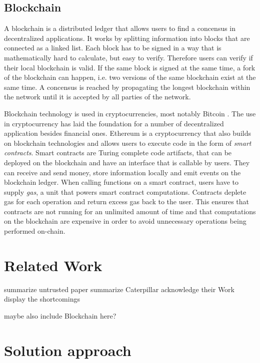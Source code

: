 \documentclass[runningheads]{llncs}
\begin{document}
\subsection{Blockchain}
A blockchain is a distributed ledger that allows users to find a concensus in decentralized applications.
It works by splitting information into blocks that are connected as a linked list. 
Each block has to be signed in a way that is mathematically hard to calculate, but easy to verify.
Therefore users can verify if their local blockchain is valid.
If the same block is signed at the same time, a fork of the blockchain can happen, i.e. two versions of the same blockchain exist at the same time.
A concensus is reached by propagating the longest blockchain within the network until it is accepted by all parties of the network.

Blockchain technology is used in cryptocurrencies, most notably Bitcoin \cite{nakamoto2008bitcoin}.
The use in cryptocurrency has laid the foundation for a number of decentralized application besides financial ones.
Ethereum \cite{wood2014ethereum} is a cryptocurrency that also builds on blockchain technologies and allows users to execute code in the form of \emph{smart contracts}.
Smart contracts are Turing complete code artifacts, that can be deployed on the blockchain and have an interface that is callable by users. 
They can receive and send money, store information locally and emit events on the blockchain ledger.
When calling functions on a smart contract, users have to supply \emph{gas}, a unit that powers smart contract computations.
Contracts deplete gas for each operation and return excess gas back to the user.
This ensures that contracts are not running for an unlimited amount of time and that computations on the blockchain are expensive in order to avoid unnecessary operations being performed on-chain.

\section{Related Work}

summarize untrusted paper
summarize Caterpillar
acknowledge their Work
display the shortcomings

maybe also include Blockchain here? 

\section{Solution approach}
\end{document}
